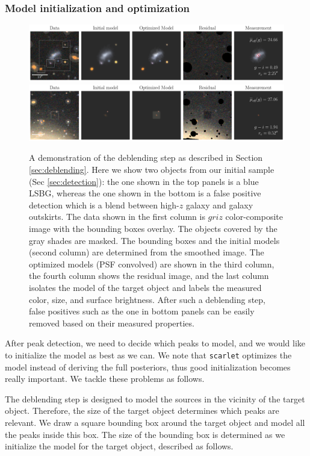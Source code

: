 \documentclass[twocolumn,astrosymb,twocolappendix]{aastex631}
\newcommand{\code}[1]{\texttt{#1}}
\begin{document}
\begin{CJK*}{UTF8}{gbsn}
\subsubsection{Model initialization and optimization}

\begin{figure}
	\vbox{ 
		\centering
		\includegraphics[width=1\linewidth]{vanilla_scarlet_demo.pdf}
		\includegraphics[width=1\linewidth]{vanilla_scarlet_demo2.pdf}
	}
	\caption{A demonstration of the deblending step as described in Section \ref{sec:deblending}. Here we show two objects from our initial sample (Sec \ref{sec:detection}): the one shown in the top panels is a blue LSBG, whereas the one shown in the bottom is a false positive detection which is a blend between high-$z$ galaxy and galaxy outskirts. The data shown in the first column is $griz$ color-composite image with the bounding boxes overlay. The objects covered by the gray shades are masked. The bounding boxes and the initial models (second column) are determined from the smoothed image. The optimized models (PSF convolved) are shown in the third column, the fourth column shows the residual image, and the last column isolates the model of the target object and labels the measured color, size, and surface brightness. After such a deblending step, false positives such as the one in bottom panels can be easily removed based on their measured properties. 
	}
	\label{fig:vanilla_scarlet_demo}
\end{figure}

After peak detection, we need to decide which peaks to model, and we would like to initialize the model as best as we can. We note that \code{scarlet} optimizes the model instead of deriving the full posteriors, thus good initialization becomes really important. We tackle these problems as follows. 

The deblending step is designed to model the sources in the vicinity of the target object. Therefore, the size of the target object determines which peaks are relevant. We draw a square bounding box around the target object and model all the peaks inside this box. The size of the bounding box is determined as we initialize the model for the target object, described as follows.


\end{CJK*}
\end{document}
